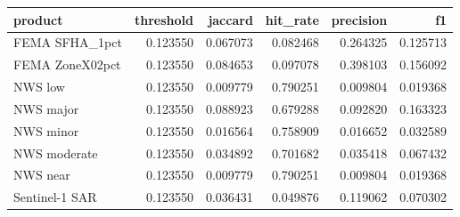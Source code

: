 \begin{tabular}{lrrrrr}
\toprule
product & threshold & jaccard & hit\_rate & precision & f1 \\
\midrule
FEMA SFHA\_1pct & 0.123550 & 0.067073 & 0.082468 & 0.264325 & 0.125713 \\
FEMA ZoneX02pct & 0.123550 & 0.084653 & 0.097078 & 0.398103 & 0.156092 \\
NWS low & 0.123550 & 0.009779 & 0.790251 & 0.009804 & 0.019368 \\
NWS major & 0.123550 & 0.088923 & 0.679288 & 0.092820 & 0.163323 \\
NWS minor & 0.123550 & 0.016564 & 0.758909 & 0.016652 & 0.032589 \\
NWS moderate & 0.123550 & 0.034892 & 0.701682 & 0.035418 & 0.067432 \\
NWS near & 0.123550 & 0.009779 & 0.790251 & 0.009804 & 0.019368 \\
Sentinel-1 SAR & 0.123550 & 0.036431 & 0.049876 & 0.119062 & 0.070302 \\
\bottomrule
\end{tabular}
